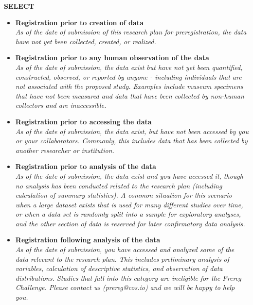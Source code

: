 \documentclass{article}
\begin{document}
	\textbf{SELECT}
	\fi
	
	\begin{itemize}
		 \item \textbf{Registration prior to creation of data}\\
		 \ifx\hidehints\undefined
		 \textit{As of the date of submission of this research plan for preregistration, the data have not yet been collected, created, or realized.}
		 \fi
		 \item \textbf{Registration prior to any human observation of the data}\\
		 \ifx\hidehints\undefined
		 \textit{As of the date of submission, the data exist but have not yet been quantified, constructed, observed, or reported by anyone - including individuals that are not associated with the proposed study. Examples include museum specimens that have not been measured and data that have been collected by non-human collectors and are inaccessible.}
		 \fi
		 \item \textbf{Registration prior to accessing the data}\\
		 \ifx\hidehints\undefined
		 \textit{As of the date of submission, the data exist, but have not been accessed by you or your collaborators. Commonly, this includes data that has been collected by another researcher or institution.}\fi
		 \item \textbf{Registration prior to analysis of the data}\\
		 \ifx\hidehints\undefined
		 \textit{As of the date of submission, the data exist and you have accessed it, though no analysis has been conducted related to the research plan (including calculation of summary statistics). A common situation for this scenario when a large dataset exists that is used for many different studies over time, or when a data set is randomly split into a sample for exploratory analyses, and the other section of data is reserved for later confirmatory data analysis.}\fi
		 \item \textbf{Registration following analysis of the data}\\
		 \ifx\hidehints\undefined
		 \textit{As of the date of submission, you have accessed and analyzed some of the data relevant to the research plan. This includes preliminary analysis of variables, calculation of descriptive statistics, and observation of data distributions. Studies that fall into this category are ineligible for the Prereg Challenge. Please contact us (prereg@cos.io) and we will be happy to help you.}\fi
	\end{itemize}
	
\end{document}

